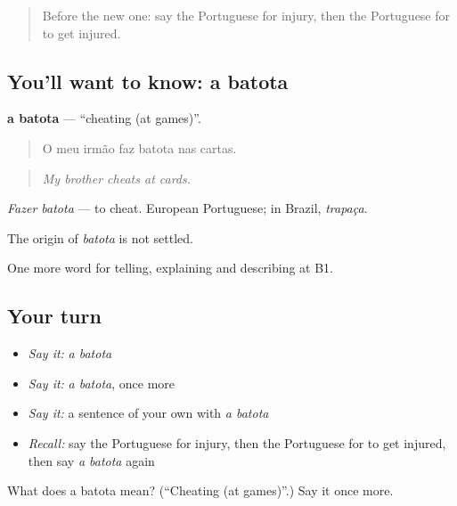 \label{lesson:PT-C515-batota}



\begin{quote}
Before the new one: say the Portuguese for injury, then the Portuguese for to get injured.
\end{quote}

\subsection*{You'll want to know: a batota}
\textbf{a batota} — \textquotedblleft{}cheating (at games)\textquotedblright{}.

\begin{quote}
O meu irmão faz batota nas cartas.
\end{quote}

\begin{quote}
\emph{My brother cheats at cards.}
\end{quote}

\emph{Fazer batota} — to cheat. European Portuguese; in Brazil, \emph{trapaça}.

\begin{cousinweb}
The origin of \emph{batota} is not settled.
\end{cousinweb}

\begin{grammarlens}[title={What you've built}]
One more word for telling, explaining and describing at B1.
\end{grammarlens}

\subsection*{Your turn}
\begin{itemize}
\raggedright
  \item \emph{Say it:} \emph{a batota}
  \item \emph{Say it:} \emph{a batota}, once more
  \item \emph{Say it:} a sentence of your own with \emph{a batota}
  \item \emph{Recall:} say the Portuguese for injury, then the Portuguese for to get injured, then say \emph{a batota} again
\end{itemize}

\begin{tcolorbox}[breakable,colback=teal!4,colframe=teal!35!black,title={Before you move on}]
What does a batota mean? (\textquotedblleft{}Cheating (at games)\textquotedblright{}.) Say it once more.
\end{tcolorbox}
